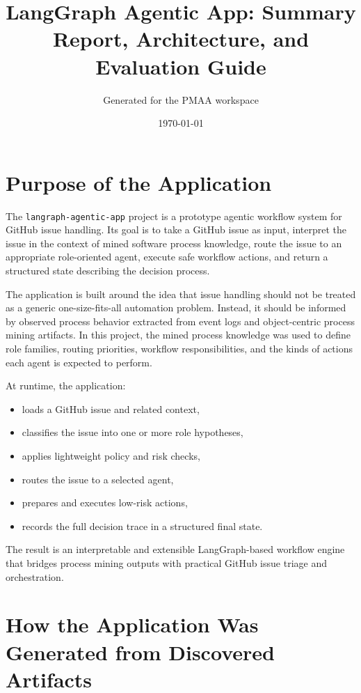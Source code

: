 \documentclass[11pt,a4paper]{article}
\title{LangGraph Agentic App: Summary Report, Architecture, and Evaluation Guide}
\author{Generated for the PMAA workspace}
\date{\today}
\begin{document}
\maketitle

\tableofcontents
\newpage

\section{Purpose of the Application}

The \texttt{langraph-agentic-app} project is a prototype agentic workflow system for GitHub issue handling. Its goal is to take a GitHub issue as input, interpret the issue in the context of mined software process knowledge, route the issue to an appropriate role-oriented agent, execute safe workflow actions, and return a structured state describing the decision process.

The application is built around the idea that issue handling should not be treated as a generic one-size-fits-all automation problem. Instead, it should be informed by observed process behavior extracted from event logs and object-centric process mining artifacts. In this project, the mined process knowledge was used to define role families, routing priorities, workflow responsibilities, and the kinds of actions each agent is expected to perform.

At runtime, the application:
\begin{itemize}
    \item loads a GitHub issue and related context,
    \item classifies the issue into one or more role hypotheses,
    \item applies lightweight policy and risk checks,
    \item routes the issue to a selected agent,
    \item prepares and executes low-risk actions,
    \item records the full decision trace in a structured final state.
\end{itemize}

The result is an interpretable and extensible LangGraph-based workflow engine that bridges process mining outputs with practical GitHub issue triage and orchestration.

\section{How the Application Was Generated from Discovered Artifacts}
\end{document}
